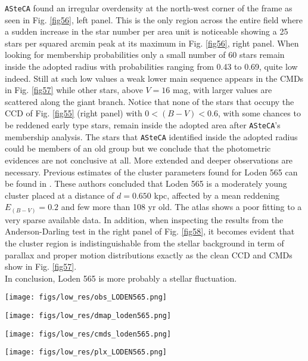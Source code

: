 \documentclass{aa}
\begin{document}
\texttt{ASteCA} found an irregular overdensity at the north-west corner of the
frame as seen in Fig. \ref{fig56}, left panel. This is the only region across the
entire field where a sudden increase in the star number per area unit is
noticeable showing a 25 stars per squared arcmin peak at its maximum in Fig. 
\ref{fig56}, right panel.
When looking for membership probabilities only a small number of 60 stars remain
inside the adopted radius with probabilities ranging from 0.43 to 0.69, quite
low indeed. Still at such low values a weak lower main sequence appears in the
CMDs in Fig. \ref{fig57} while other stars, above $V = 16$ mag, with larger
values are scattered along the giant branch. Notice that none of the stars that
occupy the CCD of Fig. \ref{fig55} (right panel) with $0<(B-V)< 0.6$, with some
chances to be reddened early type stars, remain inside the adopted area after 
\texttt{ASteCA}'s membership analysis. The stars that \texttt{ASteCA}
identified inside the adopted radius could be members of an old group but we
conclude that the photometric evidences are not conclusive at all. More extended
and deeper observations are necessary. Previous estimates of the cluster
parameters found for Loden 565 can be found in \cite{Kharchenko_2005}.
These authors concluded that Loden 565 is a moderately young cluster placed at a
distance of $d = 0.650$ kpc, affected by a mean reddening $E_{(B-V)}= 0.2$ and
few more than 108 yr old. The \cite{Kharchenko_2005} atlas shows a
poor fitting to a very sparse available data. In addition, when inspecting the
results from the Anderson-Darling test in the right panel of Fig. \ref{fig58}, it
becomes evident that the cluster region is indistinguishable from the stellar
background in term of parallax and proper motion distributions exactly as the
clean CCD and CMDs show in Fig. \ref{fig57}.\\

In conclusion, Loden 565 is more probably a stellar fluctuation.

\begin{figure*}[ht]
    \centering
    \texttt{[image: figs/low\_res/obs\_LODEN565.png]}
    \caption{Idem Fig. \ref{fig3} for Loden 565.}
    \label{fig55}
\end{figure*}
\begin{figure*}[ht]
    \centering
    \texttt{[image: figs/low\_res/dmap\_loden565.png]}
    \caption{Idem Fig. \ref{fig4} for Loden 565.}
    \label{fig56}
\end{figure*}
\begin{figure*}[ht]
    \centering
    \texttt{[image: figs/low\_res/cmds\_loden565.png]}
    \caption{Idem Fig. \ref{fig5} for Loden 565.}
    \label{fig57}
\end{figure*}
\begin{figure*}[ht]
    \centering
    \texttt{[image: figs/low\_res/plx\_LODEN565.png]}
    \caption{Idem Fig. \ref{fig6} for Loden 565.}
    \label{fig58}
\end{figure*}
\end{document}
